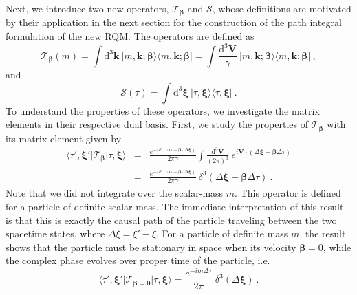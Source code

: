 \documentclass[12pt]{iopart}
\begin{document}
Next, we introduce two new operators, $\mathcal{T}_{\boldsymbol{\beta}}$ and 
$\mathcal{S}$, whose definitions are motivated by their application in the 
next section for the construction of the path integral formulation of the new RQM. 
The operators are defined as
%
    \begin{equation}
        \mathcal{T}_{\boldsymbol{\beta}}(m)=\int\mathrm{d}^3\boldsymbol{k}\ 
        \vert m,\boldsymbol{k};\boldsymbol{\beta}\rangle\langle m,\boldsymbol{k};
        \boldsymbol{\beta}\vert =\int\frac{\mathrm{d}^3\boldsymbol{V}}{\gamma}\ 
        \vert m,\boldsymbol{k};\boldsymbol{\beta}\rangle\langle m,\boldsymbol{k};
        \boldsymbol{\beta}\vert\ ,
        \label{S5eq7}
    \end{equation}
%
and
%
    \begin{equation}
        \mathcal{S}(\tau)=\int\mathrm{d}^3\boldsymbol{\xi}\ 
        \vert\tau,\boldsymbol{\xi}
        \rangle\langle\tau,\boldsymbol{\xi}\vert\ .
        \label{S5eq8}
    \end{equation}
%
To understand the properties of these operators, we investigate the matrix elements in their 
respective dual basis.  First, we study the properties of $\mathcal{T}_{\boldsymbol{\beta}}$ 
with its matrix element given by
%
    \begin{eqnarray}
        \langle\tau',\boldsymbol{\xi}'\vert\mathcal{T}_{\boldsymbol{\beta}}
        \vert\tau,\boldsymbol{\xi}\rangle&=&\frac{e^{-i E\left(\Delta\tau-\boldsymbol{\beta}
        \cdot\Delta\boldsymbol{\xi}\right)}}{2\pi\gamma}\int\frac{\mathrm{d}^3
        \boldsymbol{V}}{(2\pi)^3}\ e^{i\boldsymbol{V}\cdot\left(\Delta\boldsymbol{\xi}-
        \boldsymbol{\beta}\Delta\tau\right)}\nonumber\\&=&\frac{e^{-i E\left(\Delta\tau-\boldsymbol{\beta}
        \cdot\Delta\boldsymbol{\xi}\right)}}{2\pi\gamma}\ \delta^3\left(\Delta\boldsymbol{\xi}
        -\boldsymbol{\beta}\Delta\tau\right)\ .
        \label{S5eq9}
    \end{eqnarray}
%
Note that we did not integrate over the scalar-mass $m$. This operator is defined for a 
particle of definite scalar-mass. The immediate interpretation of this result is that this is 
exactly the causal path of the particle traveling between the two spacetime states, where 
$\Delta\xi = \xi'-\xi$. For a particle of definite mass $m$, the result shows that the
particle must be stationary in space when its velocity $\boldsymbol{\beta}=0$, 
while the complex phase evolves over proper time of the particle, i.e.
%
    \begin{equation}
        \langle\tau',\boldsymbol{\xi}'\vert\mathcal{T}_{\boldsymbol{\beta}=\boldsymbol{0}}
        \vert\tau,\boldsymbol{\xi}\rangle=\frac{e^{-i m\Delta\tau}}{2\pi}\ 
        \delta^3\left(\Delta\boldsymbol{\xi}\right)\ .
        \label{S5eq10}
    \end{equation}
%
\end{document}
